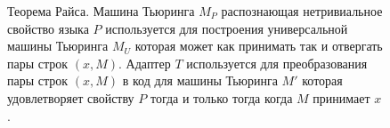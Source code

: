 \begin{figure}
\centering



\caption{Теорема Райса. Машина Тьюринга $M_P$ распознающая
  нетривиальное свойство языка $P$ используется для построения
  универсальной машины Тьюринга $M_U$ которая может как принимать так
  и отвергать пары строк $\left(x, M\right)$. Адаптер $T$ используется
  для преобразования пары строк $\left(x, M\right)$ в код для машины
  Тьюринга $M'$ которая удовлетворяет свойству $P$ тогда и только
  тогда когда $M$ принимает $x$.
} 
\label{figAddAlgoRiceTheorem}
\end{figure}

